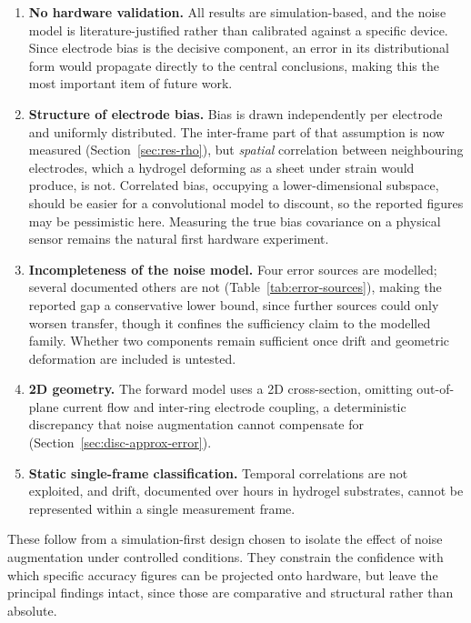 \begin{enumerate}
    \item \textbf{No hardware validation.} All results are simulation-based, and the noise model is literature-justified rather than calibrated against a specific device. Since electrode bias is the decisive component, an error in its distributional form would propagate directly to the central conclusions, making this the most important item of future work.

    \item \textbf{Structure of electrode bias.} Bias is drawn independently per electrode and uniformly distributed. The inter-frame part of that assumption is now measured (Section~\ref{sec:res-rho}), but \emph{spatial} correlation between neighbouring electrodes, which a hydrogel deforming as a sheet under strain would produce, is not. Correlated bias, occupying a lower-dimensional subspace, should be easier for a convolutional model to discount, so the reported figures may be pessimistic here. Measuring the true bias covariance on a physical sensor remains the natural first hardware experiment.

    \item \textbf{Incompleteness of the noise model.} Four error sources are modelled; several documented others are not (Table~\ref{tab:error-sources}), making the reported gap a conservative lower bound, since further sources could only worsen transfer, though it confines the sufficiency claim to the modelled family. Whether two components remain sufficient once drift and geometric deformation are included is untested.

    \item \textbf{2D geometry.} The forward model uses a 2D cross-section, omitting out-of-plane current flow and inter-ring electrode coupling, a deterministic discrepancy that noise augmentation cannot compensate for (Section~\ref{sec:disc-approx-error}).

    \item \textbf{Static single-frame classification.} Temporal correlations are not exploited, and drift, documented over hours in hydrogel substrates, cannot be represented within a single measurement frame.

\end{enumerate}

These follow from a simulation-first design chosen to isolate the effect of noise augmentation under controlled conditions. They constrain the confidence with which specific accuracy figures can be projected onto hardware, but leave the principal findings intact, since those are comparative and structural rather than absolute.
